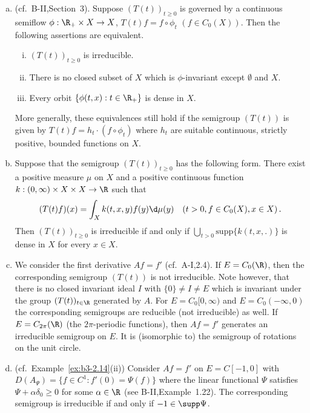 \begin{examples}\label{ex:b3-3.4}
	
\begin{enumerate}[(a), wide]
	\item 
	(cf.\ B-II,Section~3). Suppose $(T(t))_{t\geq 0}$ is governed by a continuous semiflow $\phi : \R_{+} \times X \to X$, \ie $T(t)f = f\circ\phi_{t}$ $(f\in C_{0}(X))$.
	Then the following assertions are equivalent.
	\begin{enumerate}[(i)]
		\item 
		$(T(t))_{t\geq 0}$ is irreducible.
	
		\item 
		There is no closed subset of $X$ which is $\phi$-invariant except $\emptyset$ and $X$.
	
		\item 
		Every orbit $\{\phi(t,x) : t \in \R_{+}\}$ is dense in $X$.
	\end{enumerate}
	More generally, these equivalences still hold if the semigroup $(T(t))$ is given by $T(t)f = h_{t}\cdot(f\circ\phi_{t})$ where $h_{t}$ are suitable continuous, strictly positive, bounded functions on $X$.
	
	\item 
	Suppose that the semigroup $(T(t))_{t\geq 0}$ has the following form. There exist a positive measure $\mu$ on $X$ and a positive continuous function $k : (0,\infty) \times X \times X \to \R$ such that
	\begin{equation}\label{eq:b3-3.1}
		(T(t)f)(x) = \int_{X} k(t,x,y)f(y) \d\mu(y) \quad (t > 0, f \in C_{0}(X), x \in X)\,.		
	\end{equation}	
	Then $(T(t))_{t\geq 0}$ is irreducible if and only if $\bigcup_{t>0}\text{supp}\{k(t,x,.)\}$ is dense in $X$ for every $x \in X$.
	
	\item 
	We consider the first derivative $Af = f'$ (cf.\ A-I,2.4). If $E = C_{0}(\R)$, then the corresponding semigroup $(T(t))$ is not irreducible.
	Note however, that there is no closed invariant ideal $I$ with $\{0\} \neq I \neq E$ which is invariant under the group $(T(t))_{t\in\R}$ generated by $A$.
	For $E = C_{0}[0,\infty)$ and $E = C_{0}(-\infty,0)$ the corresponding semigroups are reducible (\ie not irreducible) as well.
	If $E = C_{2\pi}(\R)$ (\ie the $2\pi$-periodic functions), then $Af = f'$ generates an irreducible semigroup on $E$.
	It is (isomorphic to) the semigroup of rotations on the unit circle.
%
%
%
%
%
	\item 
	(cf.\ Example~\ref{ex:b3-2.14}(ii)) Consider $Af = f'$ on $E = C[-1,0]$ with $D(A_{\Psi}) = \{f \in C^1 : f'(0) = \Psi(f)\}$ where the linear functional $\Psi$ satisfies $\Psi + \alpha\delta_{0} \geq 0$ for some $\alpha \in \R$ (see B-II,Example~1.22).
	The corresponding semigroup is irreducible if and only if $-1 \in \supp\Psi$.
	

\end{enumerate}
\end{examples}

